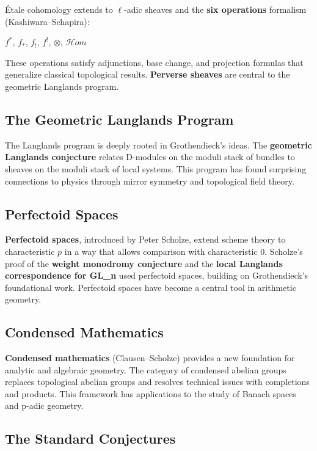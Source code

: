 Étale cohomology extends to $\ell$-adic sheaves and the \textbf{six operations}
formalism (Kashiwara--Schapira):
\begin{center}
$f^*$, $f_*$, $f_!$, $f^!$, $\otimes$, $\mathcal{H}om$
\end{center}
These operations satisfy adjunctions, base change, and projection formulas that
generalize classical topological results. \textbf{Perverse sheaves} are central
to the geometric Langlands program.

\subsection*{The Geometric Langlands Program}

The Langlands program is deeply rooted in Grothendieck's ideas. The
\textbf{geometric Langlands conjecture} relates D-modules on the moduli stack
of bundles to sheaves on the moduli stack of local systems. This program has
found surprising connections to physics through mirror symmetry and
topological field theory.

\subsection*{Perfectoid Spaces}

\textbf{Perfectoid spaces}, introduced by Peter Scholze, extend scheme theory to
characteristic $p$ in a way that allows comparison with characteristic $0$.
Scholze's proof of the \textbf{weight monodromy conjecture} and the
\textbf{local Langlands correspondence for GL_n} used perfectoid spaces,
building on Grothendieck's foundational work. Perfectoid spaces have become a
central tool in arithmetic geometry.

\subsection*{Condensed Mathematics}

\textbf{Condensed mathematics} (Clausen--Scholze) provides a new foundation for
analytic and algebraic geometry. The category of condensed abelian groups
replaces topological abelian groups and resolves technical issues with
completions and products. This framework has applications to the study of
Banach spaces and p-adic geometry.

\subsection*{The Standard Conjectures}

